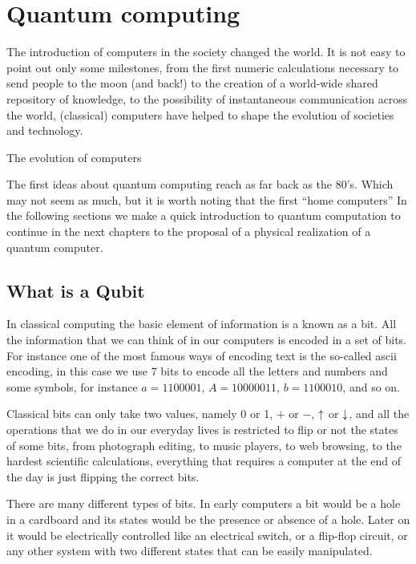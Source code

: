 \chapter{Quantum computing}
The introduction of computers in the society changed the world.
It is not easy to point out only some milestones, from the first numeric calculations necessary to send people to the moon (and back!) to the creation of a world-wide shared repository of knowledge, to the possibility of instantaneous communication across the world, (classical) computers have helped to shape the evolution of societies and technology.

The evolution of computers




The first ideas about quantum computing reach as far back as the 80's\cite{Benioff1980,Feynman1982}. Which may not seem as much, but it is worth noting that the first ``home computers''
In the following sections we make a quick introduction to quantum computation to continue in the next chapters to the proposal of a physical realization of a quantum computer.

\section{What is a Qubit}
In classical computing the basic element of information is a known as a bit. All the information that we can think of in our computers is encoded in a set of bits.
For instance one of the most famous ways of encoding text is the so-called \ac{ascii} encoding, in this case we use 7 bits to encode all the letters and numbers and some symbols, for instance $a=1100001$, $A=10000011$, $b=1100010$, and so on.

Classical bits can only take two values, namely 0 or 1, $+$ or $-$, $\uparrow$ or $\downarrow$, and all the operations that we do in our everyday lives is restricted to flip or not the states of some bits, from photograph editing, to music players, to web browsing, to the hardest scientific calculations, everything that requires a computer at the end of the day is just flipping the correct bits.


There are many different types of bits. In early computers a bit would be a hole in a cardboard and its states would be the presence or absence of a hole. Later on it would be electrically controlled like an electrical switch, or a flip-flop circuit, or any other system with two different states that can be easily manipulated.


